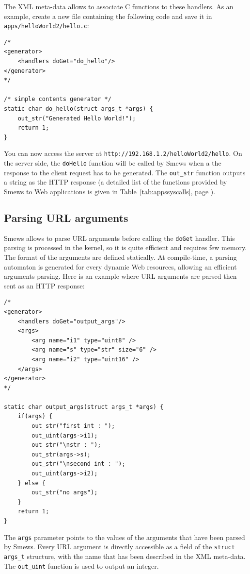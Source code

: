 \documentclass{report}
\newcommand{\rtab}[1]{Table~\ref{tab:#1}}
\begin{document}
The XML meta-data allows to associate C functions to these handlers. As an example, create a new file containing the following code and save it in \texttt{apps/helloWorld2/hello.c}:
\lstset{language=C}
\begin{lstlisting}
/*
<generator>
	<handlers doGet="do_hello"/>
</generator>
*/

/* simple contents generator */
static char do_hello(struct args_t *args) {
    out_str("Generated Hello World!");
    return 1;
}
\end{lstlisting}

You can now access the server at \verb+http://192.168.1.2/helloWorld2/hello+. On the server side, the \verb+doHello+ function will be called by Smews when a the response to the client request has to be generated. The \verb+out_str+ function outputs a string as the HTTP response (a detailed list of the functions provided by Smews to Web applications is given in \rtab{appssyscalls}, page \pageref{tab:appssyscalls}).

\subsection{Parsing URL arguments}

Smews allows to parse URL arguments before calling the \verb+doGet+ handler. This parsing is processed in the kernel, so it is quite efficient and requires few memory. The format of the arguments are defined statically. At compile-time, a parsing automaton is generated for every dynamic Web resources, allowing an efficient arguments parsing. Here is an example where URL arguments are parsed then sent as an HTTP response:

\lstset{language=C}
\begin{lstlisting}
/*
<generator>
    <handlers doGet="output_args"/>
    <args>
        <arg name="i1" type="uint8" />
        <arg name="s" type="str" size="6" />
        <arg name="i2" type="uint16" />
    </args>
</generator>
*/

static char output_args(struct args_t *args) {
    if(args) {
        out_str("first int : ");
        out_uint(args->i1);
        out_str("\nstr : ");
        out_str(args->s);
        out_str("\nsecond int : ");
        out_uint(args->i2);
    } else {
        out_str("no args");
    }
    return 1;
}
\end{lstlisting}

The \verb+args+ parameter points to the values of the arguments that have been parsed by Smews. Every URL argument is directly accessible as a field of the \verb+struct args_t+ structure, with the name that has been described in the XML meta-data. The \verb+out_uint+ function is used to output an integer.
\end{document}
